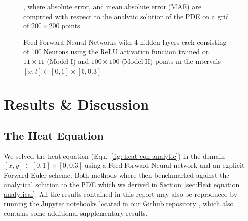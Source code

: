 \documentclass[reprint, english, nofootinbib]{revtex4-2}
\begin{document}
\begin{figure}[h!tb]
{    }
    \caption{\label{fig:ReLU composite figure}Feed-Forward Neural Networks with 4 hidden layers each consisting of 100 Neurons using the ReLU activation function trained on $11\times11$ (Model I) and $100\times100$ (Model II) points in the intervals $[x,t]\in[0,1]\times[0,0.3]$}, where absolute error, and mean absolute error (MAE) are computed with respect to the analytic solution of the PDE on a grid of $200\times200$ points.
\end{figure}

\section{Results \& Discussion}

\subsection{The Heat Equation}

\noindent
We solved the heat equation (Eqn.~\ref{fig: heat eqn analytic}) in the domain $[x,y] \in [0,1]\times[0,0.3]$ using a Feed-Forward Neural network and an explicit Forward-Euler scheme. Both methods where then benchmarked against the analytical solution to the PDE which we derived in Section~\ref{sec:Heat equation analytical}. All the results contained in this report may also be reproduced by running the Jupyter notebooks located in our Github repository \cite{github_repo}, which also contains some additional supplementary results.
\end{document}
